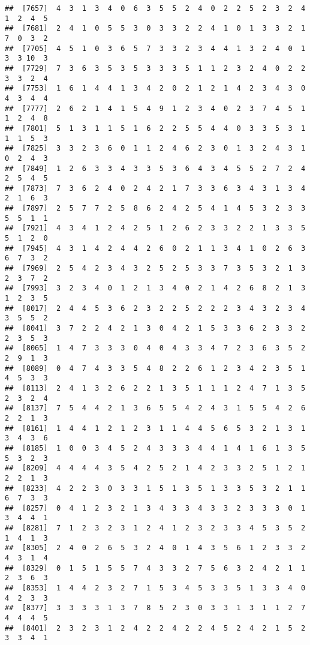 \documentclass[
]{article}
\begin{document}
\begin{verbatim}
##  [7657]  4  3  1  3  4  0  6  3  5  5  2  4  0  2  2  5  2  3  2  4  1  2  4  5
##  [7681]  2  4  1  0  5  5  3  0  3  3  2  2  4  1  0  1  3  3  2  1  7  0  3  2
##  [7705]  4  5  1  0  3  6  5  7  3  3  2  3  4  4  1  3  2  4  0  1  3  3 10  3
##  [7729]  7  3  6  3  5  3  5  3  3  3  5  1  1  2  3  2  4  0  2  2  3  3  2  4
##  [7753]  1  6  1  4  4  1  3  4  2  0  2  1  2  1  4  2  3  4  3  0  4  3  4  4
##  [7777]  2  6  2  1  4  1  5  4  9  1  2  3  4  0  2  3  7  4  5  1  1  2  4  8
##  [7801]  5  1  3  1  1  5  1  6  2  2  5  5  4  4  0  3  3  5  3  1  1  1  5  3
##  [7825]  3  3  2  3  6  0  1  1  2  4  6  2  3  0  1  3  2  4  3  1  0  2  4  3
##  [7849]  1  2  6  3  3  4  3  3  5  3  6  4  3  4  5  5  2  7  2  4  2  5  4  5
##  [7873]  7  3  6  2  4  0  2  4  2  1  7  3  3  6  3  4  3  1  3  4  2  1  6  3
##  [7897]  2  5  7  7  2  5  8  6  2  4  2  5  4  1  4  5  3  2  3  3  5  5  1  1
##  [7921]  4  3  4  1  2  4  2  5  1  2  6  2  3  3  2  2  1  3  3  5  5  1  2  0
##  [7945]  4  3  1  4  2  4  4  2  6  0  2  1  1  3  4  1  0  2  6  3  6  7  3  2
##  [7969]  2  5  4  2  3  4  3  2  5  2  5  3  3  7  3  5  3  2  1  3  2  3  7  2
##  [7993]  3  2  3  4  0  1  2  1  3  4  0  2  1  4  2  6  8  2  1  3  1  2  3  5
##  [8017]  2  4  4  5  3  6  2  3  2  2  5  2  2  2  3  4  3  2  3  4  3  5  5  2
##  [8041]  3  7  2  2  4  2  1  3  0  4  2  1  5  3  3  6  2  3  3  2  2  3  5  3
##  [8065]  1  4  7  3  3  3  0  4  0  4  3  3  4  7  2  3  6  3  5  2  2  9  1  3
##  [8089]  0  4  7  4  3  3  5  4  8  2  2  6  1  2  3  4  2  3  5  1  4  5  3  3
##  [8113]  2  4  1  3  2  6  2  2  1  3  5  1  1  1  2  4  7  1  3  5  2  3  2  4
##  [8137]  7  5  4  4  2  1  3  6  5  5  4  2  4  3  1  5  5  4  2  6  2  2  1  3
##  [8161]  1  4  4  1  2  1  2  3  1  1  4  4  5  6  5  3  2  1  3  1  3  4  3  6
##  [8185]  1  0  0  3  4  5  2  4  3  3  3  4  4  1  4  1  6  1  3  5  5  3  2  3
##  [8209]  4  4  4  4  3  5  4  2  5  2  1  4  2  3  3  2  5  1  2  1  2  2  1  3
##  [8233]  4  2  2  3  0  3  3  1  5  1  3  5  1  3  3  5  3  2  1  1  6  7  3  3
##  [8257]  0  4  1  2  3  2  1  3  4  3  3  4  3  3  2  3  3  3  0  1  3  4  4  1
##  [8281]  7  1  2  3  2  3  1  2  4  1  2  3  2  3  3  4  5  3  5  2  1  4  1  3
##  [8305]  2  4  0  2  6  5  3  2  4  0  1  4  3  5  6  1  2  3  3  2  4  3  1  4
##  [8329]  0  1  5  1  5  5  7  4  3  3  2  7  5  6  3  2  4  2  1  1  2  3  6  3
##  [8353]  1  4  4  2  3  2  7  1  5  3  4  5  3  3  5  1  3  3  4  0  4  2  3  3
##  [8377]  3  3  3  3  1  3  7  8  5  2  3  0  3  3  1  3  1  1  2  7  4  4  4  5
##  [8401]  2  3  2  3  1  2  4  2  2  4  2  2  4  5  2  4  2  1  5  2  3  3  4  1

\end{verbatim}
\end{document}

